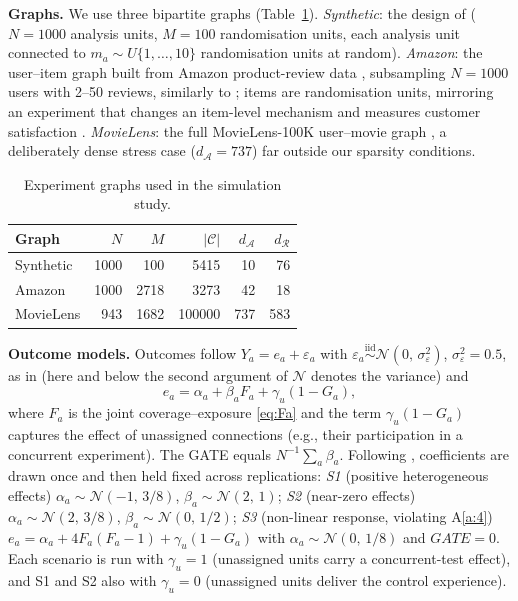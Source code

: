 \documentclass[sigconf,anonymous,review]{acmart}
\newcommand{\iidsiminline}{{\scriptstyle\stackrel{\mathrm{iid}}{\sim}}}
\begin{document}
\textbf{Graphs.} We use three bipartite graphs (Table~\ref{tab:graphs}). \emph{Synthetic}: the design of \cite[Section~6.1]{doudchenko2020causal} ($N=1000$ analysis units, $M=100$ randomisation units, each analysis unit connected to $m_a\sim U\{1,\ldots,10\}$ randomisation units at random). \emph{Amazon}: the user--item graph built from Amazon product-review data \cite{he2016ups,mcauley2015image}, subsampling $N=1000$ users with 2--50 reviews, similarly to \cite[Section~6.2]{doudchenko2020causal}; items are randomisation units, mirroring an experiment that changes an item-level mechanism and measures customer satisfaction \cite{harshaw2023erl}. \emph{MovieLens}: the full MovieLens-100K user--movie graph \cite{harper2015movielens}, a deliberately dense stress case ($d_{\mathcal A}=737$) far outside our sparsity conditions.

\begin{table}
\caption{Experiment graphs used in the simulation study.}
\label{tab:graphs}
\begin{tabular}{lrrrrr}
\toprule
Graph & $N$ & $M$ & $|\mathcal C|$ & $d_{\mathcal A}$ & $d_{\mathcal R}$\\
\midrule
Synthetic & 1000 & 100 & 5415 & 10 & 76\\
Amazon & 1000 & 2718 & 3273 & 42 & 18\\
MovieLens & 943 & 1682 & 100000 & 737 & 583\\
\bottomrule
\end{tabular}
\end{table}

\textbf{Outcome models.} Outcomes follow $Y_a = e_a + \varepsilon_a$ with $\varepsilon_a\iidsiminline\mathcal N(0,\,\sigma_\varepsilon^2)$, $\sigma_\varepsilon^2 = 0.5$, as in \cite{doudchenko2020causal} (here and below the second argument of $\mathcal N$ denotes the variance) and
\begin{equation*}
    e_a = \alpha_a + \beta_a F_a + \gamma_u (1-G_a),
\end{equation*}
where $F_a$ is the joint coverage--exposure \eqref{eq:Fa} and the term $\gamma_u(1-G_a)$ captures the effect of unassigned connections (e.g., their participation in a concurrent experiment). The GATE equals $N^{-1}\sum_a\beta_a$. Following \cite[Section~8]{harshaw2023erl}, coefficients are drawn once and then held fixed across replications: \emph{S1} (positive heterogeneous effects) $\alpha_a\sim\mathcal N(-1,\,3/8)$, $\beta_a\sim\mathcal N(2,\,1)$; \emph{S2} (near-zero effects) $\alpha_a\sim\mathcal N(2,\,3/8)$, $\beta_a\sim\mathcal N(0,\,1/2)$; \emph{S3} (non-linear response, violating A\ref{a:4}) $e_a = \alpha_a + 4F_a(F_a-1)+\gamma_u(1-G_a)$ with $\alpha_a\sim\mathcal N(0,\,1/8)$ and $GATE=0$. Each scenario is run with $\gamma_u=1$ (unassigned units carry a concurrent-test effect), and S1 and S2 also with $\gamma_u=0$ (unassigned units deliver the control experience).
\end{document}
